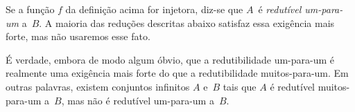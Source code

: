 \documentclass[../../../include/open-logic-section]{subfiles}
\begin{document}
Se a função $f$ da definição acima for injetora, diz-se que $A$~é
\emph{redutível um-para-um} a~$B$. A maioria das reduções descritas
abaixo satisfaz essa exigência mais forte, mas não usaremos esse fato.

\begin{digress}
É verdade, embora de modo algum óbvio, que a redutibilidade um-para-um
é realmente uma exigência mais forte do que a redutibilidade
muitos-para-um. Em outras palavras, existem conjuntos infinitos $A$
e~$B$ tais que $A$ é redutível muitos-para-um a~$B$, mas não é
redutível um-para-um a~$B$.
\end{digress}
\end{document}
